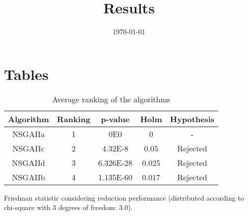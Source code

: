\documentclass{article}
\title{Results}
\author{}
\date{\today}
\begin{document}
\oddsidemargin 0in \topmargin 0in\maketitle

\section{Tables}
\begin{table}[!htp]
\centering
\begin{tabular}{c|c|c|c|c}
Algorithm&Ranking&p-value&Holm&Hypothesis\\
\hline
NSGAIIa & 1 & 0E0 & 0 & -\\
NSGAIIc & 2 & 4.32E-8 & 0.05 & Rejected\\
NSGAIId & 3 & 6.326E-28 & 0.025 & Rejected\\
NSGAIIb & 4 & 1.135E-60 & 0.017 & Rejected\\
\end{tabular}
\caption{Average ranking of the algorithms}
\end{table}


Friedman statistic considering reduction performance (distributed according to chi-square with 3 degrees of freedom: 3.0).
\end{document}

